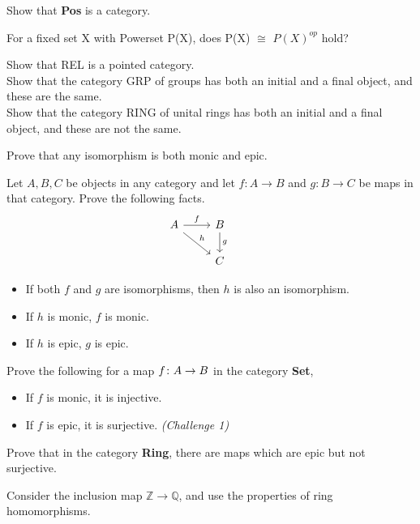 \begin {exercise}
Show that \textbf{Pos} is a category.
\end{exercise}

\begin{exercise}
For a fixed set X with Powerset P(X), does P(X) $\cong$ $P(X)^{op}$ hold?
\end{exercise}


\begin{exercise}
  Show that REL is a pointed category.
   \\ Show that the category GRP of groups has both an initial and
a final object, and these are the same.
\\ Show that the category RING of unital rings has both an initial and a
final object, and these are not the same. 
\end{exercise}

\begin{exercise}
Prove that any isomorphism is both monic and epic.
\end{exercise}
\begin{exercise}
Let $A, B, C$ be objects in any category
  and let $f : A \rightarrow B$ and $g : B \rightarrow C$
  be maps in that category. Prove the following facts.
  \[
    \begin{tikzcd}
      A \arrow{r}{f} \arrow{dr}{h} & B \arrow{d}{g} & \\
                                   & C & 
    \end{tikzcd}
  \]

  \begin{itemize}
  \item If both $f$ and $g$ are isomorphisms,
    then $h$ is also an isomorphism.
  \item If $h$ is monic, $f$ is monic.
  \item If $h$ is epic, $g$ is epic.
  \end{itemize}
\end{exercise}
\begin{exercise}
  Prove the following for a map $f \from A \to B$
  in the category \textbf{Set},
  \begin{itemize}
  \item If $f$ is monic, it is injective.
  \item If $f$ is epic, it is surjective. \textit{(Challenge 1)}
  \end{itemize}
\end{exercise}
\begin{exercise}[Challenge 2]
  Prove that in the category \textbf{Ring}, there are maps
  which are epic but not surjective.
  \begin{hint}
    Consider the inclusion map $\mathbb{Z} \to \mathbb{Q}$, and
    use the properties of ring homomorphisms.
  \end{hint}
\end{exercise}





